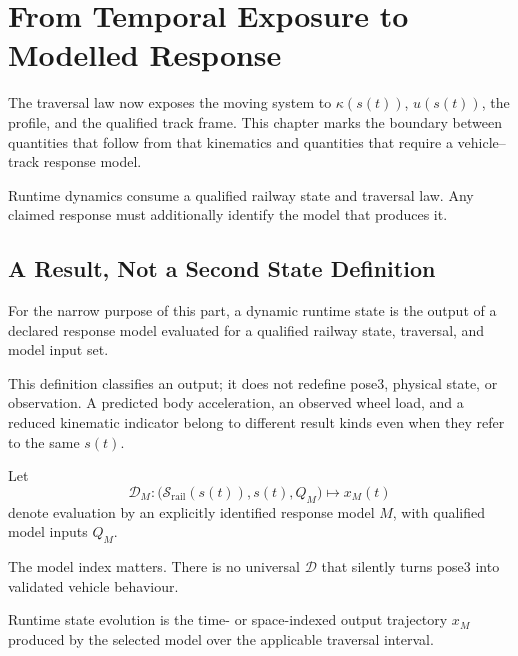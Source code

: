 \chapter{From Temporal Exposure to Modelled Response}
\label{chap:runtime-dynamics}

The traversal law now exposes the moving system to
\(\kappa(s(t))\), \(u(s(t))\), the profile, and the qualified track frame.
This chapter marks the boundary between quantities that follow from that
kinematics and quantities that require a vehicle--track response model.

\begin{principle}
\label{princ:runtime-dynamics}
Runtime dynamics consume a qualified railway state and traversal law. Any
claimed response must additionally identify the model that produces it.
\end{principle}

\section{A Result, Not a Second State Definition}

\begin{definition}
\label{def:runtime-dynamic-state}
For the narrow purpose of this part, a dynamic runtime state is the output of a
declared response model evaluated for a qualified railway state, traversal,
and model input set.
\end{definition}

This definition classifies an output; it does not redefine pose3, physical
state, or observation. A predicted body acceleration, an observed wheel load,
and a reduced kinematic indicator belong to different result kinds even when
they refer to the same \(s(t)\).

\begin{definition}
\label{def:runtime-dynamics-operator}
Let
\[
\mathcal D_M:
\bigl(\mathcal S_{\mathrm{rail}}(s(t)),s(t),Q_M\bigr)
\longmapsto x_M(t)
\]
denote evaluation by an explicitly identified response model \(M\), with
qualified model inputs \(Q_M\).
\end{definition}

The model index matters. There is no universal \(\mathcal D\) that silently
turns pose3 into validated vehicle behaviour.

\begin{definition}
\label{def:runtime-dynamics-state-evolution}
Runtime state evolution is the time- or space-indexed output trajectory
\(x_M\) produced by the selected model over the applicable traversal interval.
\end{definition}

